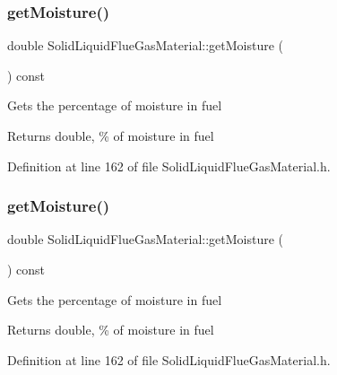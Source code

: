 \subsubsection{\texorpdfstring{get\+Moisture()}{getMoisture()}\hspace{0.1cm}{\footnotesize\ttfamily [2/3]}}
{\footnotesize\ttfamily double Solid\+Liquid\+Flue\+Gas\+Material\+::get\+Moisture (\begin{DoxyParamCaption}{ }\end{DoxyParamCaption}) const\hspace{0.3cm}{\ttfamily [inline]}}

Gets the percentage of moisture in fuel \begin{DoxyReturn}{Returns}
double, \% of moisture in fuel 
\end{DoxyReturn}


Definition at line 162 of file Solid\+Liquid\+Flue\+Gas\+Material.\+h.

\mbox{\label{class_solid_liquid_flue_gas_material_accf3c8be942d0ba244f6eabab6e7012b}} 
\subsubsection{\texorpdfstring{get\+Moisture()}{getMoisture()}\hspace{0.1cm}{\footnotesize\ttfamily [3/3]}}
{\footnotesize\ttfamily double Solid\+Liquid\+Flue\+Gas\+Material\+::get\+Moisture (\begin{DoxyParamCaption}{ }\end{DoxyParamCaption}) const\hspace{0.3cm}{\ttfamily [inline]}}

Gets the percentage of moisture in fuel \begin{DoxyReturn}{Returns}
double, \% of moisture in fuel 
\end{DoxyReturn}


Definition at line 162 of file Solid\+Liquid\+Flue\+Gas\+Material.\+h.

\mbox{\label{class_solid_liquid_flue_gas_material_ae3d9780851b8217ed2885753f11ec18b}} 
